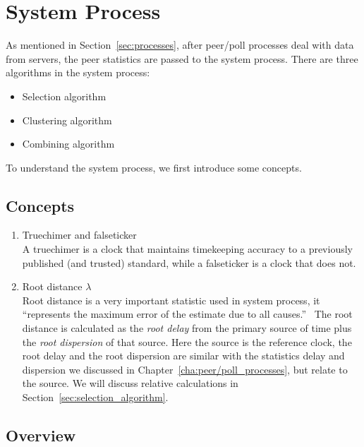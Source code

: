 

\chapter{System Process}
\label{cha:system_process}

As mentioned in Section~\ref{sec:processes}, after peer/poll processes deal
with data from servers, the peer statistics are passed to the system process.
There are three algorithms in the system process:
\begin{itemize}
    \item Selection algorithm
    \item Clustering algorithm
    \item Combining algorithm
\end{itemize}

To understand the system process, we first introduce some concepts.

\section{Concepts}%
\label{sec:system_concepts}
\begin{enumerate}
    \item Truechimer and falseticker\\
        A truechimer is a clock that maintains timekeeping accuracy to a
        previously published (and trusted) standard, while a falseticker is a
        clock that does not.
    \item Root distance $\lambda$\\
        Root distance is a very important statistic used in system process, it
        ``represents the maximum error of the estimate due to all
        causes.''~\cite{performance_metrics} The root distance is calculated as
        the \emph{root delay} from the primary source of time plus the
        \emph{root dispersion} of that source. Here the source is the reference
        clock, the root delay and the root dispersion are similar with the
        statistics delay and dispersion we discussed in
        Chapter~\ref{cha:peer/poll_processes}, but relate to the source. We
        will discuss relative calculations in
        Section~\ref{sec:selection_algorithm}.
\end{enumerate}

\section{Overview}%
\label{sec:system_overview}

